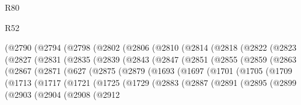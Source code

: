 \begin{lexlean}{R80}
\begin{lexlean}{R52}
\begin{coremodule}
{{{{{{{{{{{{{{{{{{{{{{{{{{{{{{{{{{{{{{{{{{{{{{{{{{{{{{{{{{{{{{{{{{{{{{{{{{{{{{{{{{{{{{{{{{{{{{{{{{{{{{{{{{{{{{{{{{{{{{{{{{{{{{{{{{{{{{{{{{{{{{{{{{{{{{{{{{{{{{{{{{{{{{{{{{{{{{{{{{{{{{{{{{{{{{{{{{{{{{          (@2790
            (@2794
              (@2798
                (@2802
                  (@2806
                    (@2810
                      (@2814
                        (@2818
                          (@2822
                            (@2823
                              (@2827
                                (@2831
                                  (@2835
                                    (@2839
                                      (@2843
                                        (@2847
                                          (@2851
                                            (@2855
                                              (@2859
                                                (@2863
                                                  (@2867
                                                    (@2871
                                                      (@627
                                                        (@2875
                                                          (@2879
                                                            (@1693
                                                              (@1697
                                                                (@1701
                                                                  (@1705
                                                                    (@1709
                                                                      (@1713
                                                                        (@1717
                                                                          (@1721
                                                                            (@1725
                                                                              (@1729
                                                                                (@2883
                                                                                  (@2887
                                                                                    (@2891
                                                                                      (@2895
                                                                                        (@2899
                                                                                          (@2903
                                                                                            (@2904
                                                                                              (@2908
                                                                                                (@2912
}}}}}}}}}}}}}}}}}}}}}}}}}}}}}}}}}}}}}}}}}}}}}}}}}}}}}}}}}}}}}}}}}}}}}}}}}}}}}}}}}}}}}}}}}}}}}}}}}}}}}}}}}}}}}}}}}}}}}}}}}}}}}}}}}}}}}}}}}}}}}}}}}}}}}}}}}}}}}}}}}}}}}}}}}}}}}}}}}}}}}}}}}}}}}}}}}}}}}}
\end{coremodule}
\end{lexlean}
\end{lexlean}
